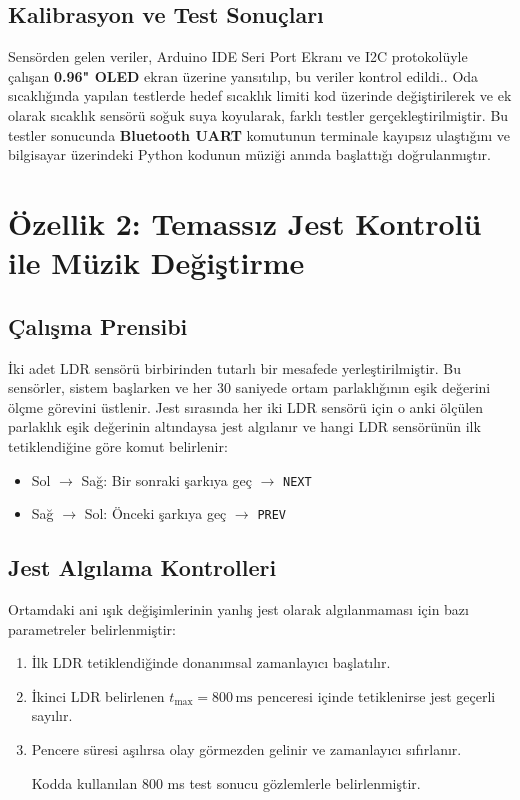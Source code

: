 \documentclass[12pt, a4paper]{article}
\begin{document}
\subsection{Kalibrasyon ve Test Sonuçları}

Sensörden gelen veriler, Arduino IDE Seri Port Ekranı ve I2C protokolüyle çalışan \textbf{ 0.96" OLED}  ekran üzerine yansıtılıp, bu veriler kontrol edildi.. Oda sıcaklığında yapılan testlerde hedef sıcaklık limiti kod üzerinde değiştirilerek ve ek olarak sıcaklık sensörü soğuk suya koyularak,  farklı testler gerçekleştirilmiştir. Bu testler sonucunda \textbf{Bluetooth UART} komutunun terminale kayıpsız ulaştığını ve bilgisayar üzerindeki Python kodunun müziği anında başlattığı doğrulanmıştır.

\section{Özellik 2: Temassız Jest Kontrolü ile Müzik Değiştirme}

\subsection{Çalışma Prensibi}

İki adet LDR sensörü birbirinden tutarlı bir mesafede
yerleştirilmiştir. Bu sensörler, sistem başlarken ve her 30 saniyede ortam parlaklığının eşik değerini ölçme görevini üstlenir. Jest sırasında her iki LDR sensörü için o anki ölçülen parlaklık eşik değerinin altındaysa jest algılanır ve hangi LDR sensörünün ilk tetiklendiğine göre komut belirlenir:

\begin{itemize}[leftmargin=*]
  \item Sol $\to$ Sağ: Bir sonraki şarkıya geç $\to$ \texttt{NEXT}
  \item Sağ $\to$ Sol: Önceki şarkıya geç $\to$ \texttt{PREV}
\end{itemize}

\subsection{Jest Algılama Kontrolleri}

Ortamdaki ani ışık değişimlerinin yanlış jest olarak algılanmaması için bazı parametreler belirlenmiştir:

\begin{enumerate}[leftmargin=*, label=\arabic*.]
  \item İlk LDR tetiklendiğinde donanımsal zamanlayıcı başlatılır.
  \item İkinci LDR belirlenen $t_{\max} = 800\,\mathrm{ms}$ penceresi içinde
        tetiklenirse jest geçerli sayılır.
  \item Pencere süresi aşılırsa olay görmezden gelinir ve zamanlayıcı sıfırlanır.

Kodda kullanılan 800 ms test sonucu gözlemlerle belirlenmiştir.
\end{enumerate}
\end{document}

